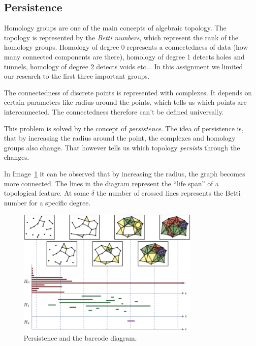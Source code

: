 \documentclass[11pt]{article}
\begin{document}
\subsection{Persistence}

Homology groups are one of the main concepts of algebraic topology. The topology is represented by the \emph{Betti numbers}, which represent the rank of the homology groups. Homology of degree 0 represents a connectedness of data (how many connected components are there), homology of degree 1 detects holes and tunnels, homology of degree 2 detects voids etc... In this assignment we limited our research to the first three important groups.

The connectedness of discrete points is represented with complexes. It depends on certain parameters like radius around the points, which tells us which points are interconnected. The connectedness therefore can't be defined universally.

This problem is solved by the concept of \emph{persistence}. The idea of persistence is, that by increasing the radius around the point, the complexes and homology groups also change. That however tells us which topology \emph{persists} through the changes.

In Image~\ref{homo} it can be observed that by increasing the radius, the graph becomes more connected. The lines in the diagram represent the ``life span'' of a topological feature. At some $\delta$ the number of crossed lines represents the Betti number for a specific degree. \cite{persist}

\begin{figure}[htb]
    \centering
    \includegraphics[width=0.8\textwidth]{homo.png}
    \caption{Persistence and the barcode diagram.}
    \label{homo}
\end{figure}
\end{document}
